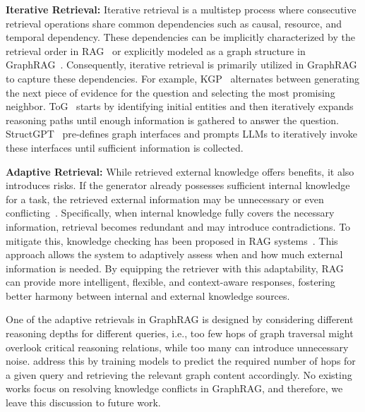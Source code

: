 \textbf{Iterative Retrieval:} Iterative retrieval is a multistep process where consecutive retrieval operations share common dependencies such as causal, resource, and temporal dependency. These dependencies can be implicitly characterized by the retrieval order in RAG~\cite{trivedi2022interleaving, yang2024rag} or explicitly modeled as a graph structure in GraphRAG~\cite{he2024make, wu2024can}. Consequently, iterative retrieval is primarily utilized in GraphRAG to capture these dependencies. For example, KGP~\cite{wang2023knowledge} alternates between generating the next piece of evidence for the question and selecting the most promising neighbor. ToG~\cite{sunthink} starts by identifying initial entities and then iteratively expands reasoning paths until enough information is gathered to answer the question. StructGPT~\cite{jiang2023structgpt} pre-defines graph interfaces and prompts LLMs to iteratively invoke these interfaces until sufficient information is collected. 


\textbf{Adaptive Retrieval:} While retrieved external knowledge offers benefits, it also introduces risks. If the generator already possesses sufficient internal knowledge for a task, the retrieved external information may be unnecessary or even conflicting~\cite{chen2022rich, xu2024knowledge}. Specifically, when internal knowledge fully covers the necessary information, retrieval becomes redundant and may introduce contradictions. To mitigate this, knowledge checking has been proposed in RAG systems~\cite{jeong2024adaptive, jin2024tug, wang2024astute, yao2024seakr}. This approach allows the system to adaptively assess when and how much external information is needed. By equipping the retriever with this adaptability, RAG can provide more intelligent, flexible, and context-aware responses, fostering better harmony between internal and external knowledge sources.

One of the adaptive retrievals in GraphRAG is designed by considering different reasoning depths for different queries, i.e., too few hops of graph traversal might overlook critical reasoning relations, while too many can introduce unnecessary noise. \citet{knowledgenavigator, wu2023retrieve} address this by training models to predict the required number of hops for a given query and retrieving the relevant graph content accordingly. No existing works focus on resolving knowledge conflicts in GraphRAG, and therefore, we leave this discussion to future work.

